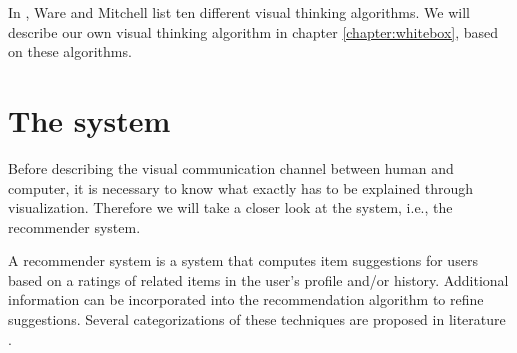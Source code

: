In \cite{ware:2004}, Ware and Mitchell list ten different visual thinking algorithms. We will describe our own visual thinking algorithm in chapter \ref{chapter:whitebox}, based on these algorithms.












% 
\section{The system}\label{chapter:literature_study:section:computer}

Before describing the visual communication channel between human and computer, it is necessary to know what exactly has to be explained through visualization. Therefore we will take a closer look at the system, i.e., the recommender system.

A recommender system is a system that computes item suggestions for users based on a ratings of related items in the user's profile and/or history. Additional information can be incorporated into the recommendation algorithm to refine suggestions. Several categorizations of these techniques are proposed in literature \cite{bostandjiev:2012, burke:2002, herlocker:2000, melville:2002:CCF:777092.777124, celma:2008:phd}.


